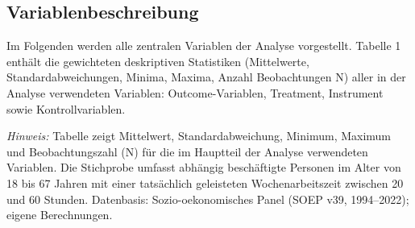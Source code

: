 \documentclass[12pt,a4paper]{article}
\begin{document}
\subsection{Variablenbeschreibung}
Im Folgenden werden alle zentralen Variablen der Analyse vorgestellt. Tabelle 1 enthält die gewichteten deskriptiven Statistiken (Mittelwerte, Standardabweichungen, Minima, Maxima, Anzahl Beobachtungen N) aller in der Analyse verwendeten Variablen: Outcome-Variablen, Treatment, Instrument sowie Kontrollvariablen.

\begin{table}[htbp]
\centering
\caption{\label{tab:descstats} Deskriptive Statistiken der Variablen}
\begin{tablenotes}
\footnotesize
\item \textit{Hinweis:} Tabelle zeigt Mittelwert, Standardabweichung, Minimum, Maximum und Beobachtungszahl (N) 
für die im Hauptteil der Analyse verwendeten Variablen. Die Stichprobe umfasst abhängig beschäftigte Personen im Alter von 18 bis 67 Jahren mit einer tatsächlich geleisteten Wochenarbeitszeit zwischen 20 und 60 Stunden. Datenbasis: Sozio-oekonomisches Panel (SOEP v39, 1994--2022); eigene Berechnungen.
\end{tablenotes}
\end{table}
\end{document}
